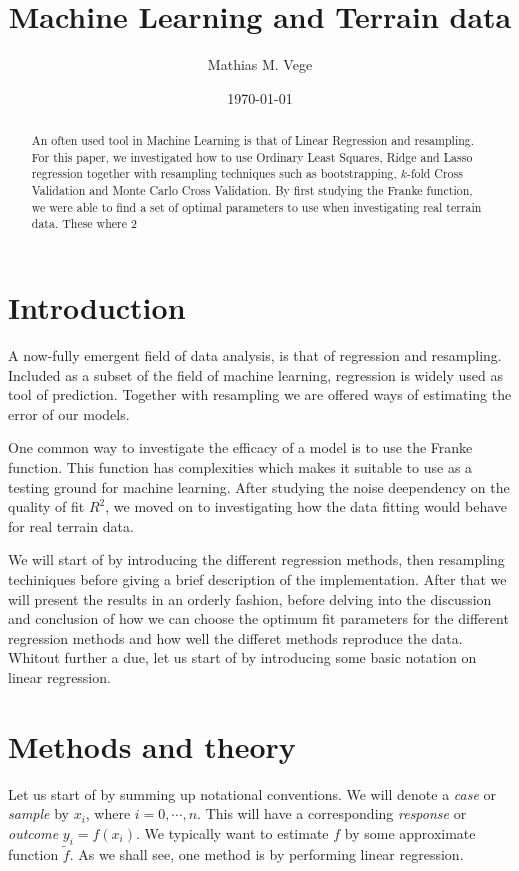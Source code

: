 \documentclass[11pt]{article}
\title{Machine Learning and Terrain data}
\author{Mathias M. Vege}
\date{\today}
\begin{document}
\maketitle

\begin{abstract}
An often used tool in Machine Learning is that of Linear Regression and resampling. For this paper, we investigated how to use Ordinary Least Squares, Ridge and Lasso regression together with resampling techniques such as bootstrapping, $k$-fold Cross Validation and Monte Carlo Cross Validation. By first studying the Franke function, we were able to find a set of optimal parameters to use when investigating real terrain data. These where $2$
\end{abstract}

\tableofcontents

\section{Introduction}
A now-fully emergent field of data analysis, is that of regression and resampling. Included as a subset of the field of machine learning, regression is widely used as tool of prediction. Together with resampling we are offered ways of estimating the error of our models.

One common way to investigate the efficacy of a model is to use the Franke function\cite{franke1979critical}. This function has complexities which makes it suitable to use as a testing ground for machine learning. After studying the noise deependency on the quality of fit $R^2$, we moved on to investigating how the data fitting would behave for real terrain data.

We will start of by introducing the different regression methods, then resampling techiniques before giving a brief description of the implementation. After that we will present the results in an orderly fashion, before delving into the discussion and conclusion of how we can choose the optimum fit parameters for the different regression methods and how well the differet methods reproduce the data. Whitout further a due, let us start of by introducing some basic notation on linear regression.

\section{Methods and theory}
Let us start of by summing up notational conventions. We will denote a \textit{case} or \textit{sample} by $x_i$, where $i=0,\cdots,n$. This will have a corresponding \textit{response} or \textit{outcome} $y_i = f(x_i)$. We typically want to estimate $f$ by some approximate function $\tilde{f}$. As we shall see, one method is by performing linear regression.
\end{document}
